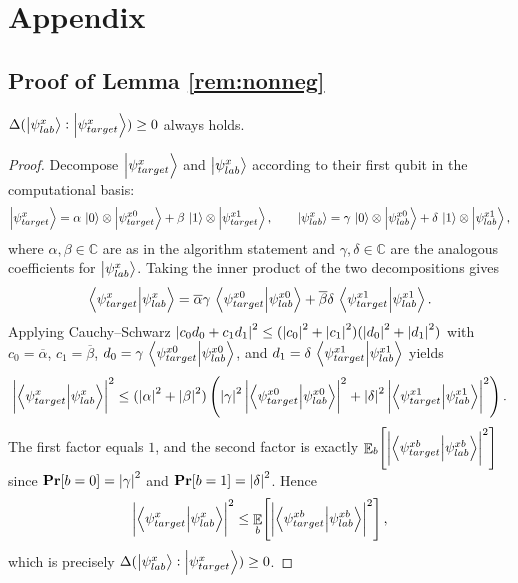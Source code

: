 \section{Appendix}\label{sec:appendix}
\subsection{Proof of Lemma \ref{rem:nonneg}}
\begin{lemma} 
    $\Delta(\ket{\psi_{lab}^x}:\ket{\psi_{target}^x}) \geq 0$ always holds. 
\end{lemma}

\begin{proof}
    Decompose $\ket{\psi_{target}^x}$ and $\ket{\psi_{lab}^x}$ according to their first qubit in the computational basis:
\[
    \ket{\psi_{target}^x} = \alpha\,\ket{0}\otimes\ket{\psi_{target}^{x0}} + \beta\,\ket{1}\otimes\ket{\psi_{target}^{x1}}, \qquad
    \ket{\psi_{lab}^x} = \gamma\,\ket{0}\otimes\ket{\psi_{lab}^{x0}} + \delta\,\ket{1}\otimes\ket{\psi_{lab}^{x1}},
\]
where $\alpha, \beta \in \mathbb{C}$ are as in 
the algorithm statement and $\gamma, \delta \in \mathbb{C}$ 
are the analogous coefficients for $\ket{\psi_{lab}^x}$.
Taking the inner product of the two decompositions gives
\[
    \braket{\psi_{target}^x}{\psi_{lab}^x}
    = \overline{\alpha}\gamma\,\braket{\psi_{target}^{x0}}{\psi_{lab}^{x0}}
    + \overline{\beta}\delta\,\braket{\psi_{target}^{x1}}{\psi_{lab}^{x1}}.
\]
Applying Cauchy--Schwarz ${\left| c_0 d_0 + c_1 d_1 \right|}^2 \leq ({\left| c_0 \right|}^2 + {\left| c_1 \right|}^2)({\left| d_0 \right|}^2 + {\left| d_1 \right|}^2)$ with $c_0 = \overline{\alpha}$, $c_1 = \overline{\beta}$, $d_0 = \gamma\,\braket{\psi_{target}^{x0}}{\psi_{lab}^{x0}}$, and $d_1 = \delta\,\braket{\psi_{target}^{x1}}{\psi_{lab}^{x1}}$ yields
\[
    {\left| \braket{\psi_{target}^x}{\psi_{lab}^x} \right|}^2
    \leq ({\left| \alpha \right|}^2 + {\left| \beta \right|}^2)\left({\left| \gamma \right|}^2\,{\left| \braket{\psi_{target}^{x0}}{\psi_{lab}^{x0}} \right|}^2 + {\left| \delta \right|}^2\,{\left| \braket{\psi_{target}^{x1}}{\psi_{lab}^{x1}} \right|}^2\right).
\]
The first factor equals $1$, and the second factor is exactly $\mathop{\mathbb{E}}_b\!\left[{\left| \braket{\psi_{target}^{xb}}{\psi_{lab}^{xb}} \right|}^2\right]$ since $\operatorname{{\bf Pr}}[b=0] = {\left| \gamma \right|}^2$ and $\operatorname{{\bf Pr}}[b=1] = {\left| \delta \right|}^2$. Hence
\[
    {\left| \braket{\psi_{target}^x}{\psi_{lab}^x} \right|}^2 \leq \mathop{\mathbb{E}}_b\!\left[{\left| \braket{\psi_{target}^{xb}}{\psi_{lab}^{xb}} \right|}^2\right],
\]
which is precisely $\Delta(\ket{\psi_{lab}^x}:\ket{\psi_{target}^x}) \geq 0$.
\end{proof}

